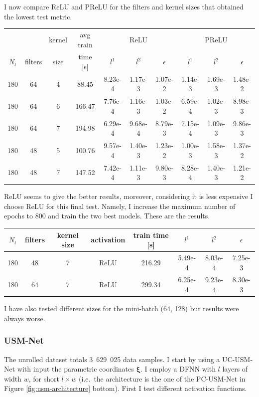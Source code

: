 \documentclass[11pt]{article}
\begin{document}
I now compare ReLU and PReLU for the filters and kernel sizes that obtained the lowest test metric.

\begin{center}
\begin{tabular}{ |c|c|c|c|c|c|c|c|c|c| } 
 &&kernel&avg train&\multicolumn{3}{c|}{ReLU}&\multicolumn{3}{c|}{PReLU}\\
 $N_t$ & filters & size  &  time [s] & $l^1$ & $l^2$ & $\epsilon$ & $l^1$ & $l^2$ & $\epsilon$ \\ 
 \hline
 180 & 64 & 4 & 88.45 & 8.23e-4 & 1.17e-3 & 1.07e-2 & 1.14e-3 & 1.69e-3 & 1.48e-2\\
 180 & 64 & 6 & 166.47 & 7.76e-4 & 1.16e-3 & 1.03e-2 & 6.59e-4 & 1.02e-3 & 8.98e-3\\
 180 & 64 & 7 & 194.98 & 6.29e-4 & 9.68e-4 & 8.79e-3 & 7.15e-4 & 1.09e-3 & 9.86e-3\\
 180 & 48 & 5 & 100.76 & 9.57e-4 & 1.40e-3 & 1.23e-2 & 1.00e-3 & 1.58e-3 & 1.37e-2\\
 180 & 48 & 7 & 147.52 & 7.42e-4 & 1.11e-3 & 9.80e-3 & 8.28e-4 & 1.40e-3 & 1.21e-2\\
\end{tabular}
\end{center}

ReLU seems to give the better results, moreover, considering it is less expensive I choose ReLU for this final test. Namely, I increase the maximum number of epochs to 800 and train the two best models. These are the results.

\begin{center}
\begin{tabular}{ c|c|c|c|c|c|c|c } 
 $N_t$ & filters & kernel size & activation & train time [s] & $l^1$ & $l^2$ & $\epsilon$ \\ 
 \hline
 180 & 48 & 7 & ReLU & 216.29 & 5.49e-4 & 8.03e-4 & 7.25e-3\\
 180 & 64 & 7 & ReLU & 299.34 & 6.25e-4 & 9.23e-4 & 8.30e-3\\

\end{tabular}
\end{center}
I have also tested different sizes for the mini-batch (64, 128) but results were always worse.


\subsubsection{USM-Net}\label{sec:usmnet-lapl}
The unrolled dataset totals 3~629~025 data samples. I start by using a UC-USM-Net with input the parametric coordinates $\boldsymbol \xi$. I employ a DFNN with $l$ layers of width $w$, for short $l \times w$ (i.e.\ the architecture is the one of the PC-USM-Net in Figure \ref{fig:usm-architecture} bottom). First I test different activation functions.
\end{document}
